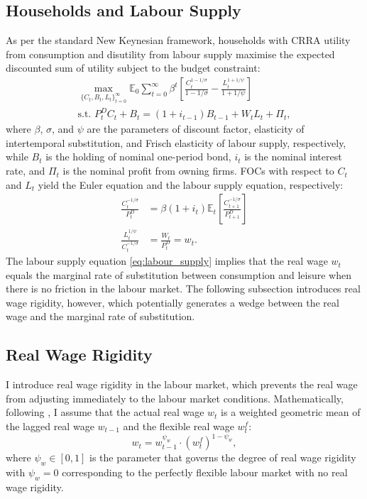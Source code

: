 \documentclass[a4paper, 12pt]{article}
\newcommand{\E}{\mathbb{E}}
\newcommand{\suminf}[1]{\sum_{#1=0}^\infty}
\theoremstyle{definition*}
\begin{document}
\subsection{Households and Labour Supply}
As per the standard New Keynesian framework, households with CRRA utility from consumption and disutility from labour supply maximise the expected discounted sum of utility subject to the budget constraint:
\begin{align}
  \max_{\{C_t, B_t, L_t\}_{t = 0}^\infty}\E_0\suminf{t}\beta^t\left[\frac{C_t^{1 - 1/\sigma}}{1 - 1/\sigma} - \frac{L_t^{1 + 1/\psi}}{1 + 1/\psi}\right] \\
  \text{s.t. } P^D_tC_t + B_t = (1 + i_{t-1})B_{t-1} + W_tL_t + \Pi_t,
\end{align}
where $\beta$, $\sigma$, and $\psi$ are the parameters of discount factor, elasticity of intertemporal substitution, and Frisch elasticity of labour supply, respectively, while $B_t$ is the holding of nominal one-period bond, $i_t$ is the nominal interest rate, and $\Pi_t$ is the nominal profit from owning firms.
FOCs with respect to $C_t$ and $L_t$ yield the Euler equation and the labour supply equation, respectively:
\begin{align}
  \frac{C_t^{-1/\sigma}}{P^D_t} &= \beta(1 + i_t)\E_t\left[\frac{C_{t+1}^{-1/\sigma}}{P^D_{t+1}}\right] \label{eq:euler} \\
  \frac{L_t^{1/\psi}}{C_t^{-1/\sigma}} &= \frac{W_t}{P^D_t} = w_t. \label{eq:labour_supply}
\end{align}
The labour supply equation \eqref{eq:labour_supply} implies that the real wage $w_t$ equals the marginal rate of substitution between consumption and leisure when there is no friction in the labour market.
The following subsection introduces real wage rigidity, however, which potentially generates a wedge between the real wage and the marginal rate of substitution.

\subsection{Real Wage Rigidity}
I introduce real wage rigidity in the labour market, which prevents the real wage from adjusting immediately to the labour market conditions.
Mathematically, following \cite{blanchard2007real}, I assume that the actual real wage $w_t$ is a weighted geometric mean of the lagged real wage $w_{t-1}$ and the flexible real wage $w^f_t$:
\begin{equation}\label{eq:real_wage_process}
  w_t = w_{t-1}^{\psi_w}\cdot (w^f_t)^{1 - \psi_w},
\end{equation}
where $\psi_w \in [0, 1]$ is the parameter that governs the degree of real wage rigidity with $\psi_w = 0$ corresponding to the perfectly flexible labour market with no real wage rigidity.
\end{document}
